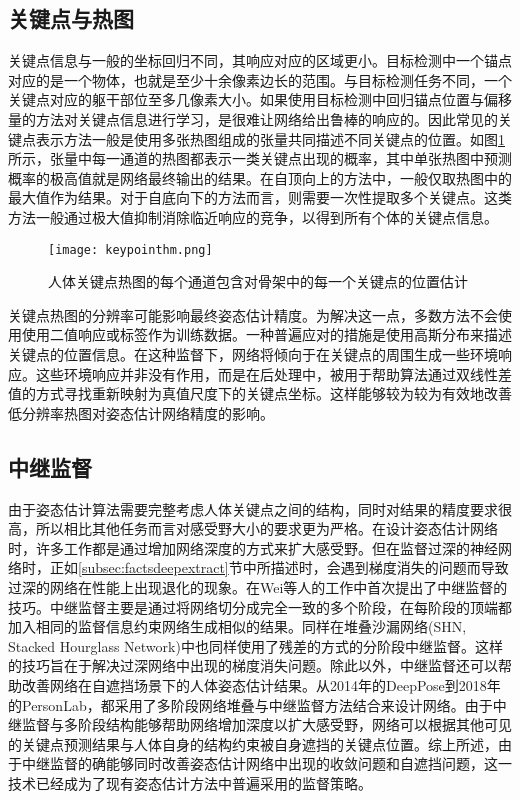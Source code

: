 \subsection{关键点与热图}
\label{subsec:factsheatmaps}
关键点信息与一般的坐标回归不同，其响应对应的区域更小。目标检测中一个锚点对应的是一个物体，也就是至少十余像素边长的范围。与目标检测任务不同，一个关键点对应的躯干部位至多几像素大小。如果使用目标检测中回归锚点位置与偏移量的方法对关键点信息进行学习，是很难让网络给出鲁棒的响应的。因此常见的关键点表示方法一般是使用多张热图组成的张量共同描述不同关键点的位置。如图\ref{fig:keypointhm}所示，张量中每一通道的热图都表示一类关键点出现的概率，其中单张热图中预测概率的极高值就是网络最终输出的结果。在自顶向上的方法中，一般仅取热图中的最大值作为结果。对于自底向下的方法而言，则需要一次性提取多个关键点。这类方法一般通过极大值抑制消除临近响应的竞争，以得到所有个体的关键点信息。

\begin{figure}[h]	
	\centering
	\texttt{[image: keypointhm.png]}
	\caption{人体关键点热图的每个通道包含对骨架中的每一个关键点的位置估计\cite{newell2016stacked}}
	\label{fig:keypointhm}
\end{figure}

关键点热图的分辨率可能影响最终姿态估计精度。为解决这一点，多数方法不会使用使用二值响应或标签作为训练数据。一种普遍应对的措施是使用高斯分布来描述关键点的位置信息。在这种监督下，网络将倾向于在关键点的周围生成一些环境响应。这些环境响应并非没有作用，而是在后处理中，被用于帮助算法通过双线性差值的方式寻找重新映射为真值尺度下的关键点坐标。这样能够较为较为有效地改善低分辨率热图对姿态估计网络精度的影响。

\subsection{中继监督}
\label{subsec:factsintersupervision}
由于姿态估计算法需要完整考虑人体关键点之间的结构，同时对结果的精度要求很高，所以相比其他任务而言对感受野大小的要求更为严格。在设计姿态估计网络时，许多工作都是通过增加网络深度的方式来扩大感受野。但在监督过深的神经网络时，正如\ref{subsec:factsdeepextract}节中所描述时，会遇到梯度消失的问题而导致过深的网络在性能上出现退化的现象。在Wei等人的工作中\cite{wei2016convolutional}首次提出了中继监督的技巧。中继监督主要是通过将网络切分成完全一致的多个阶段，在每阶段的顶端都加入相同的监督信息约束网络生成相似的结果。同样在堆叠沙漏网络(SHN, Stacked Hourglass Network)\cite{newell2016stacked}中也同样使用了残差的方式的分阶段中继监督。这样的技巧旨在于解决过深网络中出现的梯度消失问题。除此以外，中继监督还可以帮助改善网络在自遮挡场景下的人体姿态估计结果。从2014年的DeepPose\cite{toshev2014deeppose}到2018年的PersonLab\cite{Papandreou2018PersonLab}，都采用了多阶段网络堆叠与中继监督方法结合来设计网络。由于中继监督与多阶段结构能够帮助网络增加深度以扩大感受野，网络可以根据其他可见的关键点预测结果与人体自身的结构约束被自身遮挡的关键点位置。综上所述，由于中继监督的确能够同时改善姿态估计网络中出现的收敛问题和自遮挡问题，这一技术已经成为了现有姿态估计方法中普遍采用的监督策略。

